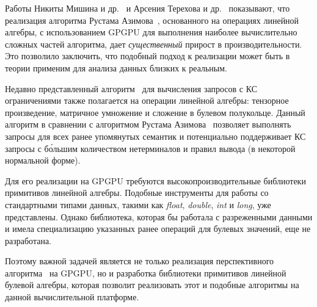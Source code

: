 Работы Никиты Мишина и др.~\cite{inproceedings:cfpq_matrix_evaluation} и Арсения Терехова и др.~\cite{inproceedings:cfqp_matrix_with_single_source} показывают, что реализация алгоритма Рустама Азимова~\cite{inproceedings:matrix_cfpq}, основанного на операциях линейной алгебры, с использованием GPGPU для выполнения наиболее вычислительно сложных частей алгоритма, дает \textit{существенный} прирост в производительности. Это позволило заключить, что подобный подход к реализации может быть в теории применим для анализа данных близких к реальным.

Недавно представленный алгоритм~\cite{inbook:kronecker_cfpq_adbis} для вычисления запросов с КС ограничениями также полагается на операции линейной алгебры: тензорное произведение, матричное умножение и сложение в булевом полукольце. Данный алгоритм в сравнении с алгоритмом Рустама Азимова~\cite{inproceedings:cfqp_matrix_with_single_source} позволяет выполнять запросы для всех ранее упомянутых семантик и потенциально поддерживает КС запросы с б\'ольшим количеством нетерминалов и правил вывода (в некоторой нормальной форме).

Для его реализации на GPGPU требуются высокопроизводительные библиотеки примитивов линейной алгебры. Подобные инструменты для работы со стандартными типами данных, такими как \textit{float}, \textit{double}, \textit{int} и \textit{long}, уже представлены. Однако библиотека, которая бы работала с разреженными данными и имела специализацию указанных ранее операций для булевых значений, еще не разработана. 

Поэтому важной задачей является не только реализация перспективного алгоритма~\cite{inbook:kronecker_cfpq_adbis} на GPGPU, но и разработка библиотеки примитивов линейной булевой алгебры, которая позволит реализовать этот и подобные алгоритмы на данной вычислительной платформе.
